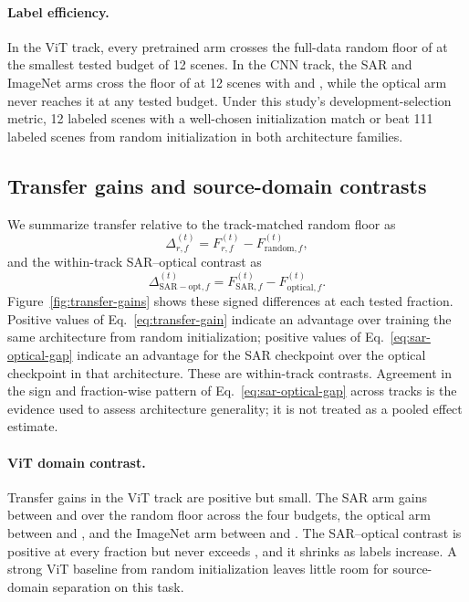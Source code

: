 \paragraph{Label efficiency.}
In the ViT track, every pretrained arm crosses the full-data random floor of
\FloorVit{} at the smallest tested budget of 12 scenes. In the CNN track, the
SAR and ImageNet arms cross the floor of \FloorCnn{} at 12 scenes with
\DevFCnnSarTen{} and \DevFCnnImageNetTen, while the optical arm never reaches
it at any tested budget. Under this study's development-selection metric, 12
labeled scenes with a well-chosen initialization match or beat 111 labeled
scenes from random initialization in both architecture families.

\subsection{Transfer gains and source-domain contrasts}
\label{sec:transfer-results}



We summarize transfer relative to the track-matched random floor as
\begin{equation}
  \Delta_{r,f}^{(t)} =
  F_{r,f}^{(t)}-F_{\mathrm{random},f}^{(t)},
  \label{eq:transfer-gain}
\end{equation}
and the within-track SAR--optical contrast as
\begin{equation}
  \Delta_{\mathrm{SAR-opt},f}^{(t)} =
  F_{\mathrm{SAR},f}^{(t)}-F_{\mathrm{optical},f}^{(t)}.
  \label{eq:sar-optical-gap}
\end{equation}
Figure~\ref{fig:transfer-gains} shows these signed differences at each tested
fraction. Positive values of Eq.~\eqref{eq:transfer-gain} indicate an
advantage over training the same architecture from random initialization;
positive values of Eq.~\eqref{eq:sar-optical-gap} indicate an advantage for
the SAR checkpoint over the optical checkpoint in that architecture. These
are within-track contrasts. Agreement in the sign and fraction-wise pattern
of Eq.~\eqref{eq:sar-optical-gap} across tracks is the evidence used to assess
architecture generality; it is not treated as a pooled effect estimate.

\paragraph{ViT domain contrast.}
Transfer gains in the ViT track are positive but small. The SAR arm gains
between \GainVitSarTenAbs{} and \GainVitSarTwentyFiveAbs{} over the
random floor across the four budgets, the optical arm between
\GainVitOpticalTenAbs{} and \GainVitOpticalTwentyFiveAbs, and the ImageNet
arm between \GainVitImageNetFiftyAbs{} and \GainVitImageNetHundredAbs. The
SAR--optical contrast is positive at every fraction but never exceeds
\SarOptVitMaxAbs, and it shrinks as labels increase. A strong ViT baseline
from random initialization leaves little room for source-domain separation on
this task.

